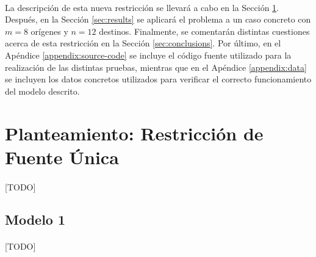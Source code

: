 \documentclass[a4paper, spanish]{article}
\begin{document}
    \paragraph{}
    La descripción de esta nueva restricción se llevará a cabo en la Sección \ref{sec:approach}. Después, en la Sección \ref{sec:results} se aplicará el problema a un caso concreto con $m = 8$ orígenes y $n = 12$ destinos. Finalmente, se comentarán distintas cuestiones acerca de esta restricción en la Sección \ref{sec:conclusions}. Por último, en el Apéndice \ref{appendix:source-code} se incluye el código fuente utilizado para la realización de las distintas pruebas, mientras que en el Apéndice \ref{appendix:data} se incluyen los datos concretos utilizados para verificar el correcto funcionamiento del modelo descrito.

  \section{Planteamiento: Restricción de Fuente Única}
  \label{sec:approach}

    \paragraph{}
    [TODO]

    \subsection{Modelo 1}
    \label{sec:approach-1}

      \paragraph{}
      [TODO]
\end{document}

